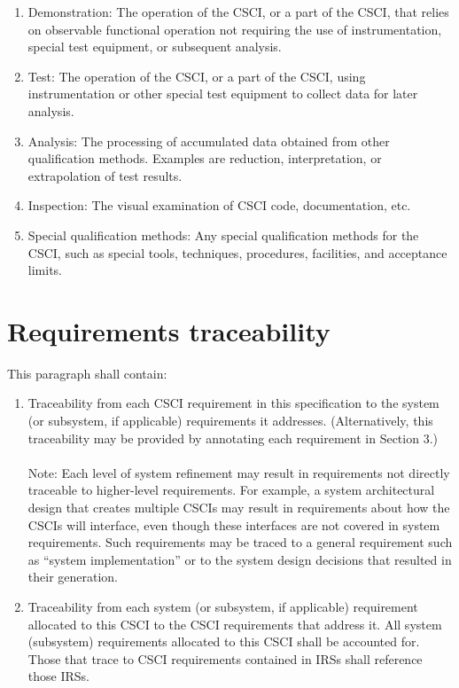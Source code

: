 \begin{enumerate}
\itemsep1pt\parskip0pt
\item
  Demonstration: The operation of the CSCI, or a part of the CSCI, that
  relies on observable functional operation not requiring the use of
  instrumentation, special test equipment, or subsequent analysis.
\item
  Test: The operation of the CSCI, or a part of the CSCI, using
  instrumentation or other special test equipment to collect data for
  later analysis.
\item
  Analysis: The processing of accumulated data obtained from other
  qualification methods. Examples are reduction, interpretation, or
  extrapolation of test results.
\item
  Inspection: The visual examination of CSCI code, documentation, etc.
\item
  Special qualification methods: Any special qualification methods for
  the CSCI, such as special tools, techniques, procedures, facilities,
  and acceptance limits.
\end{enumerate}

\section{Requirements traceability}

This paragraph shall contain:

\begin{enumerate}
\itemsep1pt\parskip0pt
\item
  Traceability from each CSCI requirement in this specification to the
  system (or subsystem, if applicable) requirements it addresses.
  (Alternatively, this traceability may be provided by annotating each
  requirement in Section 3.) \\\\ Note: Each level of system refinement
  may result in requirements not directly traceable to higher-level
  requirements. For example, a system architectural design that creates
  multiple CSCIs may result in requirements about how the CSCIs will
  interface, even though these interfaces are not covered in system
  requirements. Such requirements may be traced to a general requirement
  such as ``system implementation'' or to the system design decisions
  that resulted in their generation.
\item
  Traceability from each system (or subsystem, if applicable)
  requirement allocated to this CSCI to the CSCI requirements that
  address it. All system (subsystem) requirements allocated to this CSCI
  shall be accounted for. Those that trace to CSCI requirements
  contained in IRSs shall reference those IRSs.
\end{enumerate}

